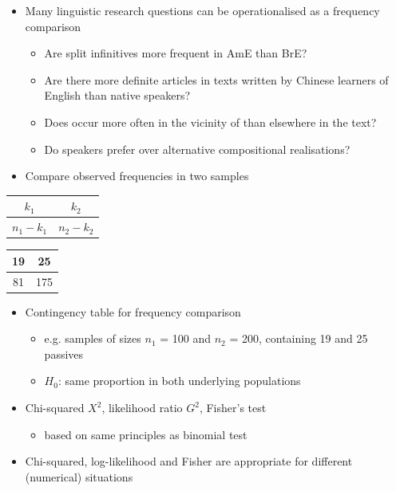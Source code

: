 \documentclass[a4paper,landscape,headrule,footrule,dvips]{foils}
\begin{document}
\begin{CJK}{UTF8}{min}
\begin{itemize}
\item Many linguistic research questions can be
operationalised as a frequency comparison
\begin{itemize}
\item Are split infinitives more frequent in AmE than BrE?
\item Are there more definite articles in texts written by
Chinese learners of English than native speakers?
\item Does  occur more often in the vicinity of 
than elsewhere in the text?
\item Do speakers prefer  over
alternative compositional realisations?
\end{itemize}
\item Compare observed frequencies in two samples
\end{itemize}



\begin{tabular}{|c|c|}
\hline
  $k_1 $ & $k_2 $ \\
\hline
  $n_1 - k_1 $ & $n_2 - k_2 $ \\
\hline
\end{tabular}
\begin{tabular}{|c|c|}
\hline
  19 & 25 \\
\hline
  81 & 175 \\ 
\hline
\end{tabular}

\begin{itemize}
\item Contingency table for frequency comparison
\begin{itemize}
\item e.g. samples of sizes $n_1$ = 100 and $n_2$ = 200,
containing 19 and 25 passives
\item $H_0$: same proportion in both underlying populations
\end{itemize}
\item Chi-squared $X^2$, likelihood ratio $G^2$, Fisher's test
  \begin{itemize}
  \item based on same principles as binomial test
  \end{itemize}
\end{itemize}


\begin{itemize}
\item Chi-squared, log-likelihood and Fisher are
appropriate for different (numerical) situations


\end{itemize}
\end{CJK}
\end{document}
